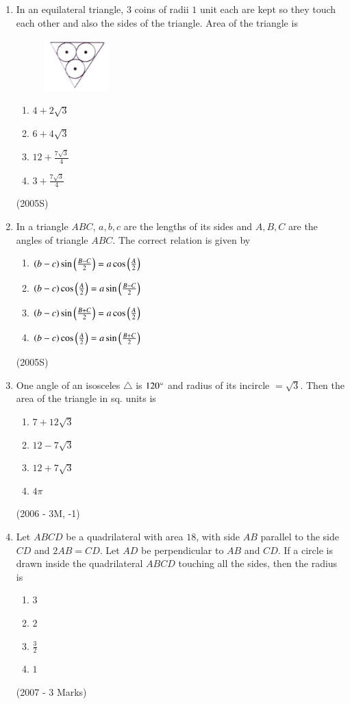 \begin{enumerate}[label=\thesubsection.\arabic*,ref=\thesubsection.\theenumi]
\item In an equilateral triangle, $3$ coins of radii $1$ unit each are kept so they touch each other and also the sides of the triangle. Area of the triangle is 
\begin{figure}[htp]
    \centering
    \includegraphics[width=2.5cm]{figs/figure.png}
    \label{fig:figure}
\end{figure}
\begin{enumerate}
\item $4+2\sqrt{3}$
\item $6+4\sqrt{3}$
\item $12+\frac{7\sqrt{3}}{4}$
\item $3+\frac{7\sqrt{3}}{4}$
\end{enumerate}
\hfill (2005S)

\item In a triangle $ABC$, $a, b, c$  are the lengths of its sides and $A, B, C$ are the angles of triangle $ABC$. The correct relation is given by
\begin{enumerate}
\item $\left(b-c\right) \sin \left(\frac{B-C}{2}\right) = a \cos \left(\frac{A}{2}\right)$
\item $\left(b-c\right) \cos \left(\frac{A}{2}\right) = a \sin \left(\frac{B-C}{2}\right)$
\item $\left(b-c\right) \sin \left(\frac{B+C}{2}\right) = a \cos \left(\frac{A}{2}\right)$
\item $\left(b-c\right) \cos \left(\frac{A}{2}\right) = a \sin \left(\frac{B+C}{2}\right)$
\end{enumerate}
\hfill (2005S)

\item One angle of an isosceles $\triangle$ is $120\degree$ and radius of its incircle $= \sqrt{3}$. Then the area of the triangle in sq. units is 
\begin{enumerate}
\item $7+12\sqrt{3}$
\item $12-7\sqrt{3}$
\item $12+7\sqrt{3}$
\item $4\pi$
\end{enumerate}
\hfill (2006 - 3M, -1)

\item Let $ABCD$ be a quadrilateral with area $18$, with side $AB$ parallel to the side $CD$ and $2AB = CD$. Let $AD$ be perpendicular to $AB$ and $CD$. If a circle is drawn inside the quadrilateral $ABCD$ touching all the sides, then the radius is
\begin{enumerate}
\item $3$
\item $2$
\item $\frac{3}{2}$
\item $1$
\end{enumerate}
\hfill (2007 - 3 Marks)


\end{enumerate}
